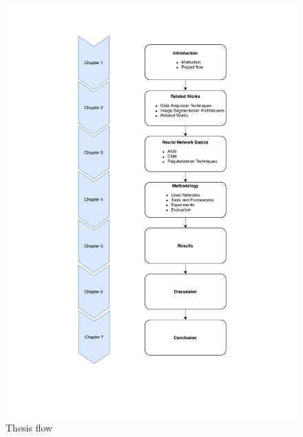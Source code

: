 \begin{figure}
    \centerline{\includegraphics[width=1\columnwidth]{01-introduction/figures/project-flow.pdf}}
    \caption{ Thesis flow }
    \label{fig:project-flow}
\end{figure}